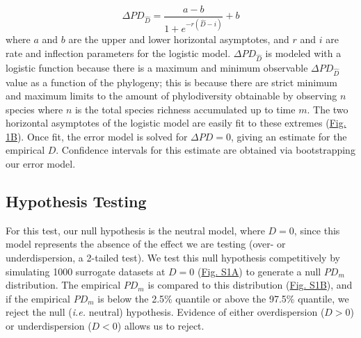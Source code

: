 \documentclass{article}
\begin{document}
\begin{equation}
	\label{sec:equation2}
	\Delta PD_{\hat{D}} = \frac {a-b} { 1 + e^{-r(\hat{D} -i)} } + b 
\end{equation}
where \(a\) and \(b\) are the upper and lower horizontal asymptotes, and \(r\) and \(i\) are rate and inflection parameters for the logistic model. \(\Delta PD_{\hat{D}}\) is modeled with a logistic function because there is a maximum and minimum observable \(\Delta PD_{\hat{D}}\) value as a function of the phylogeny; this is because there are strict minimum and maximum limits to the amount of phylodiversity obtainable by observing \(n\) species where \(n\) is the total species richness accumulated up to time \(m\). The two horizontal asymptotes of the logistic model are easily fit to these extremes (\hyperref[sec:figure1]{Fig. 1B}). Once fit, the error model is solved for \(\Delta PD=0\), giving an estimate for the empirical \(D\). Confidence intervals for this estimate are obtained via bootstrapping our error model.

\subsection{Hypothesis Testing} \label{sec:hypothesisTesting}
For this test, our null hypothesis is the neutral model, where \(D = 0\), since this model represents the absence of the effect we are testing (over- or underdispersion, a 2-tailed test). We test this null hypothesis competitively by simulating 1000 surrogate datasets at \(D = 0\) (\hyperref[sec:figureS1]{Fig. S1A}) to generate a null \(PD_m\) distribution. The empirical \(PD_m\) is compared to this distribution (\hyperref[sec:figureS1]{Fig. S1B}), and if the empirical \(PD_m\) is below the 2.5\% quantile or above the 97.5\% quantile, we reject the null (\emph{i.e.} neutral) hypothesis. Evidence of either overdispersion (\(D > 0\)) or underdispersion (\(D < 0\)) allows us to reject.
\end{document}
